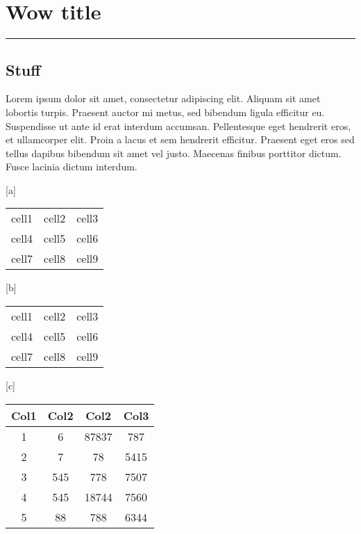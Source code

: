\chapter{Wow title}\label{capit:cap3}
\vspace{-2.0325ex}%
\noindent
\rule{\textwidth}{0.5pt}
\vspace{-5.5ex}%
\newcommand{\pushline}{\Indp}%

\section{Stuff}
Lorem ipsum dolor sit amet, consectetur adipiscing elit. Aliquam sit amet lobortis turpis. Praesent auctor mi metus, sed bibendum ligula efficitur eu. Suspendisse ut ante id erat interdum accumsan. Pellentesque eget hendrerit eros, et ullamcorper elit. Proin a lacus et sem hendrerit efficitur. Praesent eget eros sed tellus dapibus bibendum sit amet vel justo. Maecenas finibus porttitor dictum. Fusce lacinia dictum interdum.

\begin{center}[a]
\begin{tabular}{ c c c }
 cell1 & cell2 & cell3 \\ 
 cell4 & cell5 & cell6 \\  
 cell7 & cell8 & cell9    
\end{tabular}
\end{center}

\begin{center}[b]
\begin{tabular}{ |c|c|c| } 
 \hline
 cell1 & cell2 & cell3 \\ 
 cell4 & cell5 & cell6 \\ 
 cell7 & cell8 & cell9 \\ 
 \hline
\end{tabular}
\end{center}

\begin{center}[c]
 \begin{tabular}{||c c c c||} 
 \hline
 Col1 & Col2 & Col2 & Col3 \\ [0.5ex] 
 \hline\hline
 1 & 6 & 87837 & 787 \\ 
 \hline
 2 & 7 & 78 & 5415 \\
 \hline
 3 & 545 & 778 & 7507 \\
 \hline
 4 & 545 & 18744 & 7560 \\
 \hline
 5 & 88 & 788 & 6344 \\ [1ex] 
 \hline
\end{tabular}
\end{center}

